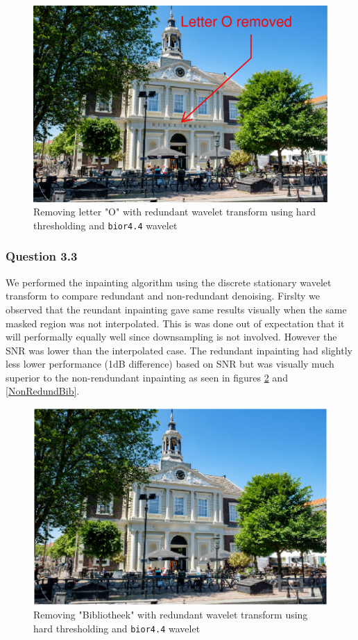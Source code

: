 \documentclass[a4paper]{article}
\begin{document}
\begin{figure}[H]
	\centering %
	\includegraphics[width=0.9\linewidth]{Images/letterO_reconHardInfo.png}
	\caption{Removing letter "O" with redundant wavelet transform using hard thresholding and \texttt{bior4.4} wavelet}
	\label{letterO}
\end{figure}

\subsubsection{Question 3.3}
We performed the inpainting algorithm using the discrete stationary wavelet transform to compare redundant and non-redundant denoising. Firslty we observed that the reundant inpainting gave same results visually when the same masked region was not interpolated. This is was done out of expectation that it will performally equally well since downsampling is not involved. However the SNR was lower than the interpolated case. The redundant inpainting had slightly less lower performance (1dB difference) based on SNR but was visually much superior to the non-rendundant inpainting as seen in figures \ref{WorkingRed}
and \ref{NonRedundBib}.
\begin{figure}[H]
	\centering %
	\includegraphics[width=0.7\linewidth]{Images/Redundant_all_letters.png}
	\caption{Removing "Bibliotheek" with  redundant wavelet transform using hard thresholding and \texttt{bior4.4} wavelet}
	\label{WorkingRed}
\end{figure}
\end{document}
